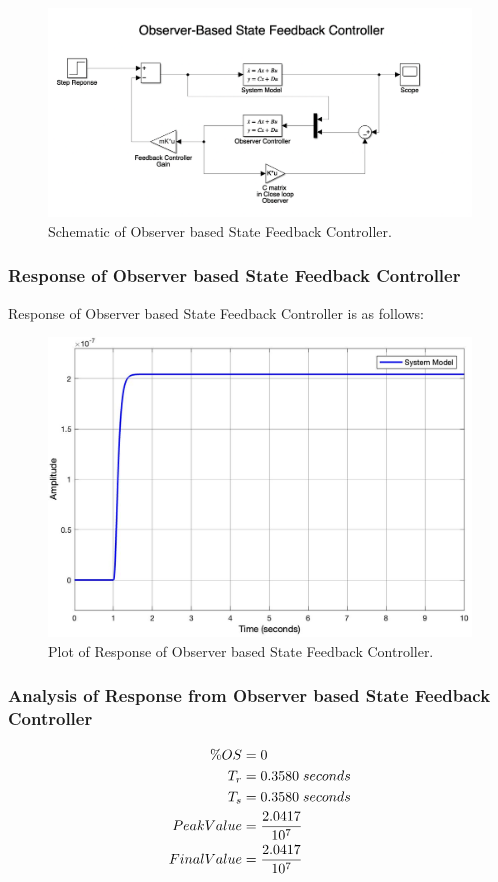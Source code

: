 \documentclass{article}
\begin{document}
\begin{figure}[h!]
\centering
\includegraphics[scale=0.3]{ObserverbasedSFC.jpeg}
\caption{Schematic of  Observer based State Feedback Controller.}
\end{figure}
\vskip30pt

\subsubsection{Response of Observer based State Feedback Controller}
Response of Observer based State Feedback Controller is as follows: 
\begin{figure}[h!]
\centering
\includegraphics[scale=0.25]{ObserverbasedSFC_response.jpg}
\caption{Plot of Response of  Observer based State Feedback Controller.}
\end{figure}
\vskip10pt

\subsubsection{Analysis of Response from Observer based State Feedback Controller}
\begin{equation}\begin{aligned}
\%OS & = 0\\
T_r & = 0.3580 \;seconds \\
T_s & = 0.3580 \;seconds\\
Peak Value & = \frac{2.0417}{10^7} \\
Final Value & = \frac{2.0417}{10^7} \end{aligned} \notag \end{equation}\vskip150pt
\end{document}
